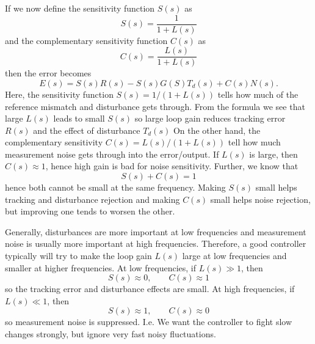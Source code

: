 If we now define the sensitivity function $S(s)$ as
\begin{equation*}
  S(s) = \frac{1}{1 + L(s)}
\end{equation*}
and the complementary sensitivity function $C(s)$ as
\begin{equation*}
  C(s) = \frac{L(s)}{1 + L(s)}
\end{equation*}
then the error becomes
\begin{equation*}
  E(s) = S(s) R(s) - S(s) G(S) T_d(s) + C(s) N(s)
.\end{equation*}
Here, the sensitivity function $S(s) = 1 / (1 + L(s) )$ tells how much of the reference mismatch and disturbance gets through.
From the formula we see that large $L(s)$ leads to small $S(s)$ so large loop gain reduces tracking error $R(s)$ and the effect of disturbance $T_d(s)$
On the other hand, the complementary sensitivity $C(s) = L(s) / (1 + L(s))$ tell how much measurement noise gets through into the error/output.
If $L(s)$ is large, then $C(s) \approx 1$, hence high gain is bad for noise sensitivity. 
Further, we know that
\begin{equation*}
  S(s) + C(s) = 1
\end{equation*}
hence both cannot be small at the same frequency.
Making $S(s)$ small helps tracking and disturbance rejection and making $C(s)$ small helps noise rejection, but improving one tends to worsen the other. 

Generally, disturbances are more important at low frequencies and measurement noise is usually more important at high frequencies.
Therefore, a good controller typically will try to make the loop gain $L(s)$ large at low frequencies and smaller at higher frequencies.
At low frequencies, if $L(s) \gg 1$, then
\begin{equation*}
  S(s) \approx 0, \qquad C(s) \approx 1
\end{equation*}
so the tracking error and disturbance effects are small.
At high frequencies, if $L(s) \ll 1$, then
\begin{equation*}
  S(s) \approx 1, \qquad C(s) \approx 0
\end{equation*}
so measurement noise is suppressed.
I.e. We want the controller to fight slow changes strongly, but ignore very fast noisy fluctuations. 


